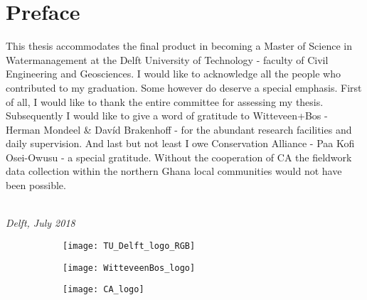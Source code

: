 \chapter*{Preface}
This thesis accommodates the final product in becoming a Master of Science in Watermanagement at the Delft University of Technology \-- faculty of Civil Engineering and Geosciences. I would like to acknowledge all the people who contributed to my graduation. Some however do deserve a special emphasis. First of all, I would like to thank the entire committee for assessing my thesis. Subsequently I would like to give a word of gratitude to Witteveen+Bos \-- Herman Mondeel \& Davíd Brakenhoff \-- for the abundant research facilities and daily supervision. And last but not least I owe Conservation Alliance \-- Paa Kofi Osei-Owusu \-- a special gratitude. Without the cooperation of CA the fieldwork data collection within the northern Ghana local communities would not have been possible.  


\begin{flushright}
{\makeatletter\itshape
    \@author \\
    Delft, July 2018
\makeatother}
\end{flushright}

\bigskip

% 
% 

 
\begin{figure}[ht]
	\centering
	\begin{subfigure}[a]{0.33\linewidth}
		\texttt{[image: TU\_Delft\_logo\_RGB]}
		\label{fig:TUlogo}
	\end{subfigure}\vfill
	\begin{subfigure}[b]{0.33\linewidth}
        \texttt{[image: WitteveenBos\_logo]}
		\label{fig:WBlogo}
		\bigskip
		\bigskip
	\end{subfigure}\vfill
	\begin{subfigure}[c]{0.33\linewidth}
		\texttt{[image: CA\_logo]}
		\label{fig:CAlogo}	
	\end{subfigure} 
\end{figure} 
